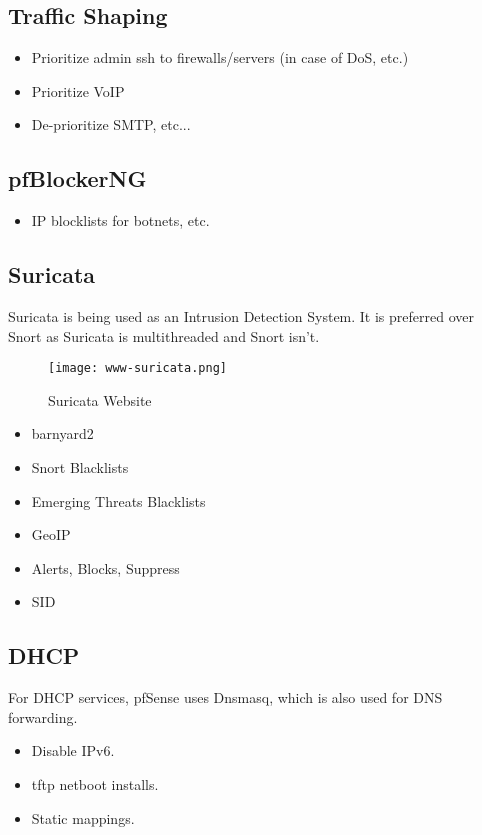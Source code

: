 \subsection{Traffic Shaping}
\begin{itemize}
 \item Prioritize admin ssh to firewalls/servers (in case of DoS, etc.)
 \item Prioritize VoIP
 \item De-prioritize SMTP, etc...
\end{itemize}

\subsection{pfBlockerNG}
\begin{itemize}
 \item IP blocklists for botnets, etc.
\end{itemize}


\subsection{Suricata}
Suricata is being used as an Intrusion Detection System.
It is preferred over Snort as Suricata is multithreaded and Snort isn't.

\begin{figure}[h!]
\texttt{[image: www-suricata.png]}
 \caption{Suricata Website}
 \label{fig:www-suricata}
\end{figure}

\begin{itemize}
 \item barnyard2
 \item Snort Blacklists
 \item Emerging Threats Blacklists
 \item GeoIP
 \item Alerts, Blocks, Suppress
 \item SID
\end{itemize}


\subsection{DHCP}
For DHCP services, pfSense uses Dnsmasq, which is also used for DNS
forwarding.

\begin{itemize}
 \item Disable IPv6.
 \item tftp netboot installs.
 \item Static mappings.
\end{itemize}


